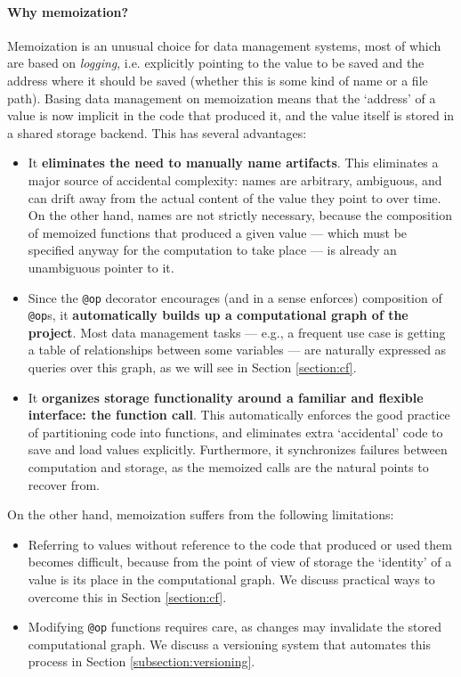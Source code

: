 \documentclass{article} %
\begin{document}
\paragraph{Why memoization?} Memoization is an unusual choice for data
management systems, most of which are based on \emph{logging}, i.e. explicitly
pointing to the value to be saved and the address where it should be saved
(whether this is some kind of name or a file path). Basing data management on
memoization means that the `address' of a value is now implicit in the code that
produced it, and the value itself is stored in a shared storage backend. This has several advantages:
\begin{itemize}
\item It \textbf{eliminates the need to manually name artifacts}. This
eliminates a major source of accidental complexity: names are arbitrary,
ambiguous, and can drift away from the actual content of the value they point to
over time. On the other hand, names are not strictly necessary, because the
composition of memoized functions that produced a given value --- which must be
specified anyway for the computation to take place --- is already an unambiguous
pointer to it.
\item Since the \texttt{@op} decorator encourages (and in a sense enforces)
composition of \texttt{@op}s, it \textbf{automatically builds up a computational
graph of the project}. Most data management tasks --- e.g., a frequent use case
is getting a table of relationships between some variables --- are naturally
expressed as queries over this graph, as we will see in Section
\ref{section:cf}.
\item It \textbf{organizes storage functionality around a familiar and flexible
interface: the function call}. This automatically enforces the good practice
of partitioning code into functions, and eliminates extra `accidental' code to
save and load values explicitly. Furthermore, it synchronizes failures between
computation and storage, as the memoized calls are the natural points to
recover from.
\end{itemize}

On the other hand, memoization suffers from the following limitations:
\begin{itemize}
\item Referring to values without reference to the code that produced or used
them becomes difficult, because from the point of view of storage the `identity'
of a value is its place in the computational graph. We discuss practical ways to
overcome this in Section \ref{section:cf}.
\item Modifying \texttt{@op} functions requires care, as changes may invalidate
the stored computational graph. We discuss a versioning system that automates this process in Section \ref{subsection:versioning}.
\end{itemize}
\end{document}
